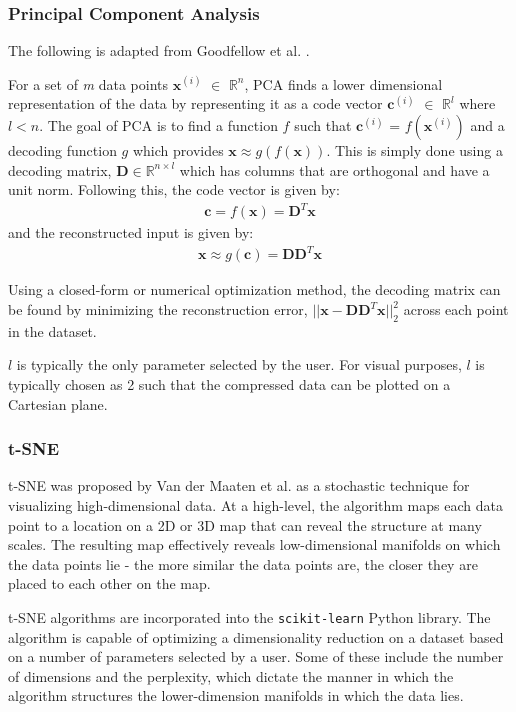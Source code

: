 \documentclass[11pt]{article}
\begin{document}
\subsubsection*{Principal Component Analysis}
The following is adapted from Goodfellow et al. \cite{GoodBengCour16}.

For a set of \textit{m} data points $\textbf{x}^{(i)}$ $\in$ $\mathbb{R}^n$, PCA finds a lower dimensional representation of the data by representing it as a code vector $\textbf{c}^{(i)}$ $\in$ $\mathbb{R}^l$ where $l < n$. The goal of PCA is to find a function $f$ such that $\textbf{c}^{(i)}$ = $f(\textbf{x}^{(i)})$ and a decoding function $g$ which provides $\textbf{x} \approx g(f(\textbf{x}))$. This is simply done using a decoding matrix, $\textbf{D} \in \mathbb{R}^{n \times l}$ which has columns that are orthogonal and have a unit norm. Following this, the code vector is given by:
\begin{align*}
    \textbf{c} = f(\textbf{x}) = \textbf{D}^T\textbf{x}
\end{align*}
and the reconstructed input is given by:
\begin{align*}
    \textbf{x} \approx g(\textbf{c}) = \textbf{D}\textbf{D}^T\textbf{x}
\end{align*} 

Using a closed-form or numerical optimization method, the decoding matrix can be found by minimizing the reconstruction error, $||\textbf{x} - \textbf{D}\textbf{D}^T\textbf{x}||_2^2$ across each point in the dataset.
 
$l$ is typically the only parameter selected by the user. For visual purposes, $l$ is typically chosen as 2 such that the compressed data can be plotted on a Cartesian plane.

\subsubsection*{t-SNE}
t-SNE was proposed by Van der Maaten et al. \cite{vanDerMaaten2008} as a stochastic technique for visualizing high-dimensional data. At a high-level, the algorithm maps each data point to a location on a 2D or 3D map that can reveal the structure at many scales. The resulting map effectively reveals low-dimensional manifolds on which the data points lie - the more similar the data points are, the closer they are placed to each other on the map.

t-SNE algorithms are incorporated into the \verb|scikit-learn| Python library. The algorithm is capable of optimizing a dimensionality reduction on a dataset based on a number of parameters selected by a user. Some of these include the number of dimensions and the perplexity, which dictate the manner in which the algorithm structures the lower-dimension manifolds in which the data lies.
\end{document}
